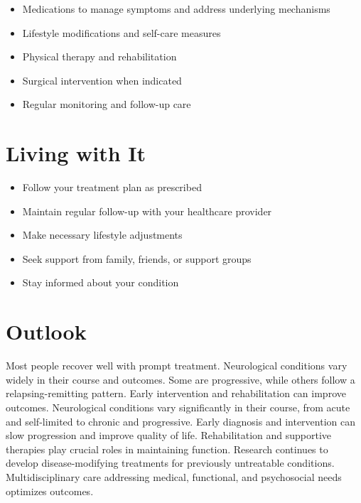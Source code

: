 \begin{itemize}[noitemsep]
  \item Medications to manage symptoms and address underlying mechanisms
  \item Lifestyle modifications and self-care measures
  \item Physical therapy and rehabilitation
  \item Surgical intervention when indicated
  \item Regular monitoring and follow-up care
\end{itemize}
\section{Living with It}
\begin{itemize}[noitemsep]
  \item Follow your treatment plan as prescribed
  \item Maintain regular follow-up with your healthcare provider
  \item Make necessary lifestyle adjustments
  \item Seek support from family, friends, or support groups
  \item Stay informed about your condition
\end{itemize}
\section{Outlook}
Most people recover well with prompt treatment. Neurological conditions vary widely in their course and outcomes. Some are progressive, while others follow a relapsing-remitting pattern. Early intervention and rehabilitation can improve outcomes. Neurological conditions vary significantly in their course, from acute and self-limited to chronic and progressive. Early diagnosis and intervention can slow progression and improve quality of life. Rehabilitation and supportive therapies play crucial roles in maintaining function. Research continues to develop disease-modifying treatments for previously untreatable conditions. Multidisciplinary care addressing medical, functional, and psychosocial needs optimizes outcomes.

